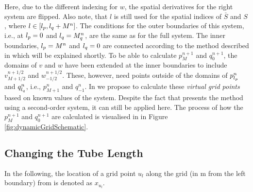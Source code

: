 Here, due to the different indexing for $w$, the spatial derivatives for the right system are flipped. Also note, that $l$ is still used for the spatial indices of $\bar S$ and $S$, where $l\in [{l_p}, {l_q}+M^n]$. The conditions for the outer boundaries of this system, i.e., at ${l_p} = 0$ and ${l_q} = M_q^n$, are the same as for the full system. The inner boundaries, ${l_p} = M^n$ and ${l_q} = 0$ are connected according to the method described in \cite{Willemsen2021} which will be explained shortly.
To be able to calculate $p_M^{n+1}$ and $q_0^{n+1}$, the domains of $v$ and $w$ have been extended at the inner boundaries to include $v_{M+1/2}^{n+1/2}$ and $w_{-1/2}^{n+1/2}$. These, however, need points outside of the domains of $p_{l_p}^n$ and $q_{l_q}^n$, i.e., $p_{M+1}^n$ and $q_{-1}^n$. In \cite{Willemsen2021} we propose to calculate these \textit{virtual grid points} based on known values of the system. Despite the fact that \cite{Willemsen2021} presents the method using a second-order system, it can still be applied here. The process of how the $p_M^{n+1}$ and $q_0^{n+1}$ are calculated is visualised in in Figure \ref{fig:dynamicGridSchematic}.

\subsection{Changing the Tube Length}
In the following, the location of a grid point $u_l$ along the grid (in m from the left boundary) from is denoted as $x_{u_l}$.

